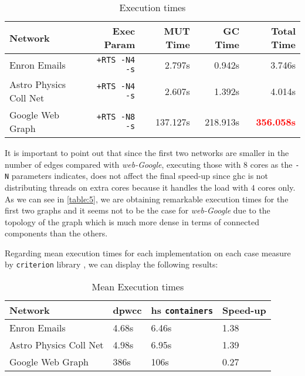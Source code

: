 \begin{table}[H]
  \centering
  \begin{tabular}{|l|r|r|r|r|}
   \hline
   \textbf{Network} & \textbf{Exec Param} & \textbf{MUT Time} & \textbf{GC Time} & \textbf{Total Time}\\
   \hline
   Enron Emails & \texttt{+RTS -N4 -s} & 2.797s & 0.942s & 3.746s \\
   \hline
   Astro Physics Coll Net & \texttt{+RTS -N4 -s} & 2.607s & 1.392s & 4.014s \\
   \hline
   Google Web Graph & \texttt{+RTS -N8 -s} & 137.127s & 218.913s & \textbf{\textcolor{red}{356.058s}} \\
   \hline
  \end{tabular}
 \caption{Execution times}
 \label{table:5}
 \end{table}

It is important to point out that since the first two networks are smaller in the number of edges compared with \emph{web-Google}, 
executing those with $8$ cores as the \texttt{-N} parameters indicates, does not affect the final speed-up since \acrshort{ghc} 
is not distributing threads on extra cores because it handles the load with $4$ cores only.
As we can see in \autoref{table:5}, we are obtaining remarkable execution times for the first two graphs and it seems not to be the case 
for \textit{web-Google} due to the topology of the graph which is much more dense in terms of connected components than the others.

Regarding mean execution times for each implementation on each case measure by \texttt{criterion} library \cite{criterion}, we can display the following results:

\begin{table}[H]
  \centering
  \begin{tabular}{|l|l|l|l|}
   \hline
   \textbf{Network} & \textbf{\acrshort{dpwcc}} & \textbf{\acrshort{hs} \texttt{containers}} & \textbf{Speed-up}\\
   \hline
   Enron Emails & 4.68s &  6.46s & 1.38\\
   \hline
   Astro Physics Coll Net & 4.98s & 6.95s  & 1.39\\
   \hline
   Google Web Graph & 386s & 106s & 0.27\\
   \hline
  \end{tabular}
 \caption{Mean Execution times}
 \label{table:6}
 \end{table}

